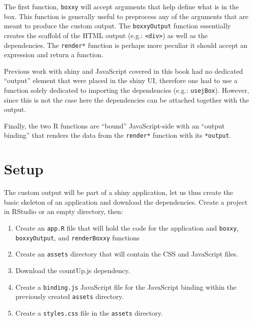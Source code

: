 \documentclass[
]{krantz}
\providecommand{\tightlist}{%
  \setlength{\itemsep}{0pt}\setlength{\parskip}{0pt}}
\begin{document}
The first function, \texttt{boxxy} will accept arguments that help define what is in the box. This function is generally useful to preprocess any of the arguments that are meant to produce the custom output. The \texttt{boxxyOutput} function essentially creates the scaffold of the HTML output (e.g.: \texttt{\textless{}div\textgreater{}}) as well as the dependencies. The \texttt{render*} function is perhaps more peculiar it should accept an expression and return a function.

Previous work with shiny and JavaScript covered in this book had no dedicated ``output'' element that were placed in the shiny UI, therefore one had to use a function solely dedicated to importing the dependencies (e.g.: \texttt{usejBox}). However, since this is not the case here the dependencies can be attached together with the output.

Finally, the two R functions are ``bound'' JavaScript-side with an ``output binding'' that renders the data from the \texttt{render*} function with its \texttt{*output}.

\hypertarget{shiny-output-setup}{%
\section{Setup}\label{shiny-output-setup}}

The custom output will be part of a shiny application, let us thus create the basic skeleton of an application and download the dependencies. Create a project in RStudio or an empty directory, then:

\begin{enumerate}
\def\labelenumi{\arabic{enumi}.}
\tightlist
\item
  Create an \texttt{app.R} file that will hold the code for the application and \texttt{boxxy}, \texttt{boxxyOutput}, and \texttt{renderBoxxy} functions
\item
  Create an \texttt{assets} directory that will contain the CSS and JavaScript files.
\item
  Download the countUp.js dependency.
\item
  Create a \texttt{binding.js} JavaScript file for the JavaScript binding within the previously created \texttt{assets} directory.
\item
  Create a \texttt{styles.css} file in the \texttt{assets} directory.
\end{enumerate}
\end{document}
